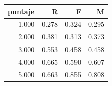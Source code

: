 \begin{tabular}{rrrr}
\toprule
puntaje & R & F & M \\
\midrule
1.000 & 0.278 & 0.324 & 0.295 \\
2.000 & 0.381 & 0.313 & 0.373 \\
3.000 & 0.553 & 0.458 & 0.458 \\
4.000 & 0.665 & 0.590 & 0.607 \\
5.000 & 0.663 & 0.855 & 0.808 \\
\bottomrule
\end{tabular}
